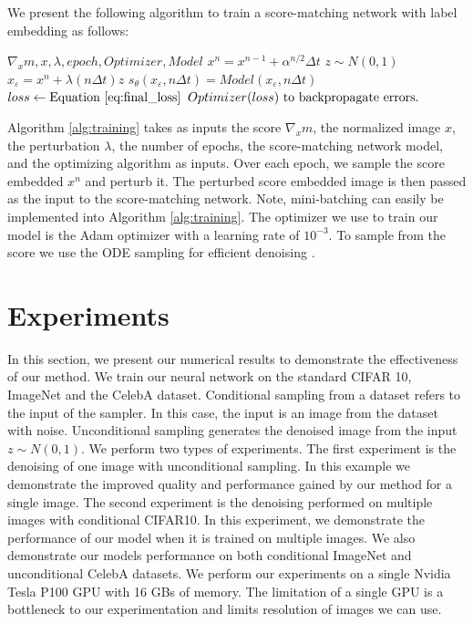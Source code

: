 \documentclass[]{interact}
\theoremstyle{plain}%
\theoremstyle{definition}
\theoremstyle{remark}
\begin{document}
We present the following algorithm to train a score-matching network with label embedding as follows:

\begin{algorithm}[htbp!]
\caption{Training: Label embedding in the feature space}\label{alg:training}
\begin{algorithmic}
\Require $\nabla_x m, x, \lambda, epoch, Optimizer, Model$
\State $x^n = x^{n-1} + \alpha^{n/2}\Delta t$
\EndFor
\State $z \sim N(0,1)$
\State $x_{\varepsilon} = x^n + \lambda(n\Delta t)z$
\State $s_{\theta}(x_{\varepsilon},n\Delta t) = Model(x_{\varepsilon},n\Delta t)$
\State $loss \leftarrow \textnormal{Equation \eqref{eq:final_loss}}$
\State $Optimizer(loss)\textnormal{ to backpropagate errors.}$
\EndFor
\end{algorithmic}
\end{algorithm}

Algorithm \ref{alg:training} takes as inputs the score $\nabla_x m$, the normalized image $x$, the perturbation $\lambda$, the number of epochs, the score-matching network model, and the optimizing algorithm as inputs. Over each epoch, we sample the score embedded $x^n$ and perturb it. The perturbed score embedded image is then passed as the input to the score-matching network. Note, mini-batching can easily be implemented into Algorithm \ref{alg:training}. The optimizer we use to train our model is the Adam optimizer \cite{kingma-2014} with a learning rate of $10^{-3}$. To sample from the score we use the ODE sampling for efficient denoising \cite{jsong-2020}.

\section{Experiments}
In this section, we present our numerical results to demonstrate the effectiveness of our method.  We train our neural network on the standard CIFAR 10, ImageNet and the CelebA dataset. Conditional sampling from a dataset refers to the input of the sampler. In this case, the input is an image from the dataset with noise. Unconditional sampling generates the denoised image from the input $z\sim N(0,1)$. We perform two types of experiments. The first experiment is the denoising of one image with unconditional sampling. In this example we demonstrate the improved quality and performance gained by our method for a single image. The second experiment is the denoising performed on multiple images with conditional CIFAR10. In this experiment, we demonstrate the performance of our model when it is trained on multiple images. We also demonstrate our models performance on both conditional ImageNet and unconditional CelebA datasets. We perform our experiments on a single Nvidia Tesla P100 GPU with 16 GBs of memory. The limitation of a single GPU is a bottleneck to our experimentation and limits resolution of images we can use.
\end{document}
